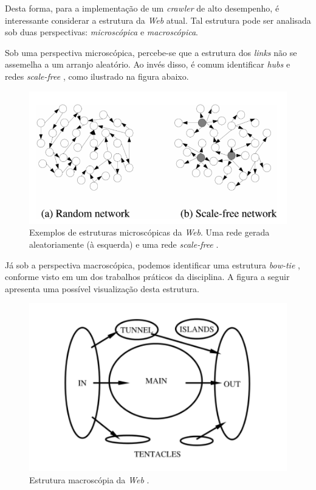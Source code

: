 \documentclass[a4paper,12pt,titlepage]{article}
\begin{document}
Desta forma, para a implementação de um \textit{crawler} de alto desempenho, é interessante considerar a estrutura da \textit{Web} atual. Tal estrutura pode ser analisada sob duas perspectivas: \textit{microscópica} e \textit{macroscópica}.

Sob uma perspectiva microscópica, percebe-se que a estrutura dos \textit{links} não se assemelha a um arranjo aleatório. Ao invés disso, é comum identificar \textit{hubs} e redes \textit{scale-free} {\cite{barabasi}}, como ilustrado na figura abaixo.

\begin{figure}[H]
     \centering
     \includegraphics[scale=0.5]{figures/network-types.png}
     \caption{Exemplos de estruturas microscópicas da \textit{Web}. Uma rede gerada aleatoriamente (à esquerda) e uma rede \textit{scale-free} \cite{barabasi}.}
     \label{bsp}
\end{figure}

Já sob a perspectiva macroscópica, podemos identificar uma estrutura \textit{bow-tie} {\cite{broder}}, conforme visto em um dos trabalhos práticos da disciplina. A figura a seguir apresenta uma possível visualização desta estrutura.
 
\begin{figure}[H]
     \centering
     \includegraphics[scale=0.5]{figures/macroscopic-structure-web.png}
     \caption{Estrutura macroscópia da \textit{Web} \cite{broder}.}
     \label{bsp}
\end{figure}
\end{document}
